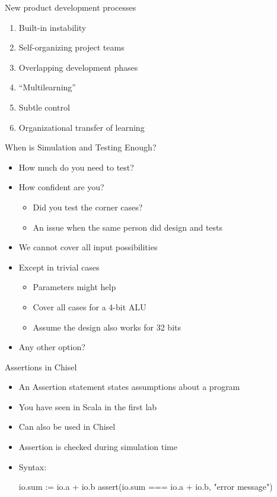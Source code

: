 \begin{frame}[fragile]{New product development processes}
\begin{enumerate}
\item Built-in instability
\item Self-organizing project teams
\item Overlapping development phases
\item ``Multilearning''
\item Subtle control
\item Organizational transfer of learning
\end{enumerate}
\end{frame}

\begin{frame}[fragile]{When is Simulation and Testing Enough?}
\begin{itemize}
\item How much do you need to test?
\item How confident are you?
\begin{itemize}
\item Did you test the corner cases?
\item An issue when the same person did design and tests
\end{itemize}
\item We cannot cover all input possibilities
\item Except in trivial cases
\begin{itemize}
\item Parameters might help
\item Cover all cases for a 4-bit ALU
\item Assume the design also works for 32 bits 
\end{itemize}
\item Any other option?
\end{itemize}
\end{frame}

\begin{frame}[fragile]{Assertions in Chisel}
\begin{itemize}
\item An Assertion statement states assumptions about a program
\item You have seen  in Scala in the first lab
\item Can also be used in Chisel
\item Assertion is checked during simulation time
\item Syntax:
\begin{chisel}
  io.sum := io.a + io.b
  assert(io.sum === io.a + io.b, "error message")
\end{chisel}
\end{itemize}
\end{frame}

